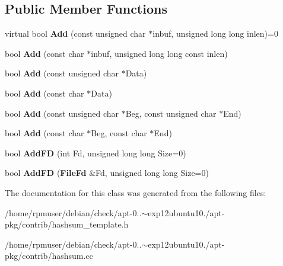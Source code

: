 \subsection*{\-Public \-Member \-Functions}
\begin{DoxyCompactItemize}
\item 
virtual bool {\bfseries \-Add} (const unsigned char $\ast$inbuf, unsigned long long inlen)=0\label{classSummationImplementation_ad941fe50a31f9b486cb6d359137875a4}

\item 
bool {\bfseries \-Add} (const char $\ast$inbuf, unsigned long long const inlen)\label{classSummationImplementation_ae98324caa9d98516e021fbb2eb4e575a}

\item 
bool {\bfseries \-Add} (const unsigned char $\ast$\-Data)\label{classSummationImplementation_a63a2347fc166a6a1c9c0b4a0bb902412}

\item 
bool {\bfseries \-Add} (const char $\ast$\-Data)\label{classSummationImplementation_a1e4b5c70e06447e00192b0dff87d140e}

\item 
bool {\bfseries \-Add} (const unsigned char $\ast$\-Beg, const unsigned char $\ast$\-End)\label{classSummationImplementation_a44d261f1d8091538cddf01568be612a7}

\item 
bool {\bfseries \-Add} (const char $\ast$\-Beg, const char $\ast$\-End)\label{classSummationImplementation_a8def83275c19358de0384f77a88de6c3}

\item 
bool {\bfseries \-Add\-F\-D} (int \-Fd, unsigned long long \-Size=0)\label{classSummationImplementation_a3b6e2493aad0ecf039aec72951323715}

\item 
bool {\bfseries \-Add\-F\-D} ({\bf \-File\-Fd} \&\-Fd, unsigned long long \-Size=0)\label{classSummationImplementation_a0d9064bf552f940c29d1ebda2468accb}

\end{DoxyCompactItemize}


\-The documentation for this class was generated from the following files\-:\begin{DoxyCompactItemize}
\item 
/home/rpmuser/debian/check/apt-\/0..$\sim$exp12ubuntu10./apt-\/pkg/contrib/hashsum\-\_\-template.\-h\item 
/home/rpmuser/debian/check/apt-\/0..$\sim$exp12ubuntu10./apt-\/pkg/contrib/hashsum.\-cc\end{DoxyCompactItemize}
